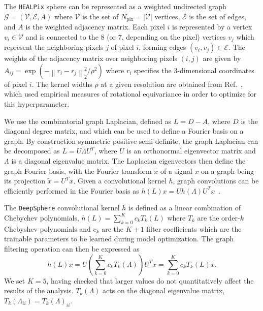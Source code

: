 \documentclass[prd,aps,10pt,nofootinbib,twocolumn,superscriptaddress,preprintnumbers,balancelastpage,longbibliography]{revtex4-1}
\begin{document}
The \texttt{HEALPix} sphere can be represented as a weighted undirected graph $\mathcal G = (\mathcal V, \mathcal E, A)$ where $\mathcal V$ is the set of $N_\mathrm{pix} = |\mathcal V|$ vertices, $\mathcal E$ is the set of edges, and $A$ is the weighted adjacency matrix. Each pixel $i$ is represented by a vertex $v_i \in \mathcal V$ and is connected to the 8 (or 7, depending on the pixel)
vertices $v_j$ which represent the neighboring pixels $j$ of pixel $i$, forming edges $(v_i
, v_j) \in \mathcal E$. The weights of the adjacency matrix over neighboring pixels $(i, j)$ are given by $A_{ij} = \exp \left(-{\left\|r_{i}-r_{j}\right\|_{2}^{2}}/{\rho^{2}}\right)$ where $r_i$ specifies the 3-dimensional coordinates of pixel $i$. The kernel widths $\rho$ at a given \HEALPix resolution are obtained from Ref.~\cite{defferrard2020deepsphere}, which used empirical measures of rotational equivariance in order to optimize for this hyperparameter.

We use the combinatorial graph Laplacian, defined as $ L =  D -  A$, where $ D$ is the diagonal degree matrix, and which can be used to define a Fourier basis on a graph. By construction symmetric positive semi-definite, the graph Laplacian can be decomposed as $ L =  U  \Lambda  U^T$, where $ U$ is an orthonormal eigenvector matrix and $ \Lambda$ is a diagonal eigenvalue matrix. The Laplacian eigenvectors then define the graph Fourier basis, with the Fourier transform $\tilde{ x}$ of a signal $ x$ on a graph being its projection $\tilde{x} =  U^T  x$.
Given a convolutional kernel $h$, graph convolutions can be efficiently performed in the Fourier basis as $h({L}) {x}={U} h({\Lambda}) {U}^{T} {x}$~\cite{defferrard2016convolutional}.

The \texttt{DeepSphere} convolutional kernel $h$ is defined as a linear combination of Chebychev polynomials, $h({{L}}) = \sum_{k=0}^{K} c_{k} T_{k}({{L}})$ where $T_k$ are the order-$k$ Chebyshev polynomials and $c_k$ are the $K + 1$ filter coefficients which are the trainable parameters to be learned during model optimization. The graph filtering operation can then be expressed as
\begin{equation}
h({L}) {x}={U}\left(\sum_{k=0}^{K} c_{k} T_k({\Lambda})\right) {U}^{T} {x}=\sum_{k=0}^{K} c_{k} T_k({L}) {x}.
\end{equation}
We set $K=5$, having checked that larger values do not quantitatively affect the results of the analysis. $T_k({\Lambda})$ acts on the diagonal eigenvalue matrix, $T_k({\Lambda_{ii}}) = T_k({\Lambda})_{ii}$. 
\end{document}
